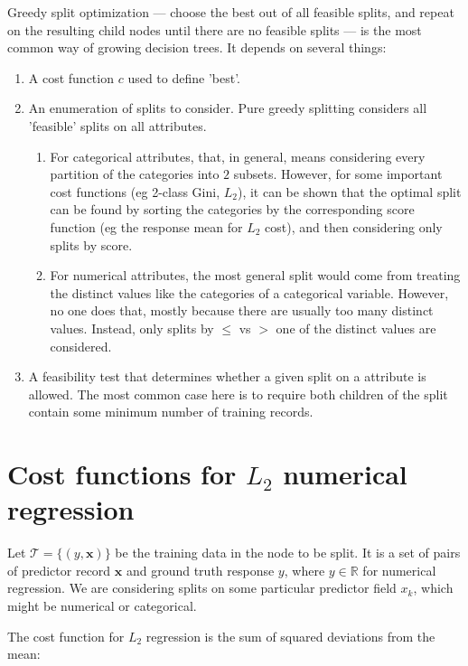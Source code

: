 Greedy split optimization --- choose the best out of all
feasible splits, and repeat on the resulting child nodes until
there are no feasible splits --- is the most common way of
growing decision trees.
It depends on several things:
\begin{enumerate}
  \item A cost function $c$ used to define 'best'.  
  \item An enumeration of splits to consider. Pure greedy 
  splitting
  considers all 'feasible' splits on all attributes.
  \begin{enumerate} 
    \item For categorical attributes, that, in general, means 
    considering every partition of the categories into $2$ 
    subsets. However, for some important cost functions 
    (eg 2-class Gini, $L_2$), it can be shown that the optimal 
    split can be found by sorting the categories by the 
    corresponding score function (eg the response mean for $L_2$ 
    cost), and then considering only splits by score.
    \item For numerical attributes, the most general split would 
    come from treating the distinct values like the categories 
    of a categorical variable. However, no one does that, mostly 
    because there are usually too many distinct values. Instead, 
    only splits by
    $\leq$ vs $>$ one of the distinct values are considered.
\end{enumerate}
\item A feasibility test that determines whether a given split 
on a attribute is allowed. The most common case here is to 
require both children of the split contain some minimum number of 
training records.
\end{enumerate}

\section{\label{sec:numerical}Cost functions for $L_2$ numerical
regression}

Let $\mathcal{T} = \{ \left( y,\mathbf{x} \right) \}$ be the
training data in the node to be split.
It is a set of pairs of predictor record $\mathbf{x}$ and 
ground truth response $y$, where $y\in\mathbb{R}$ for numerical 
regression. We are considering splits on some particular 
predictor field $x_k$, which might be numerical or categorical.

The cost function for $L_2$ regression is the sum of squared 
deviations from the mean: 

